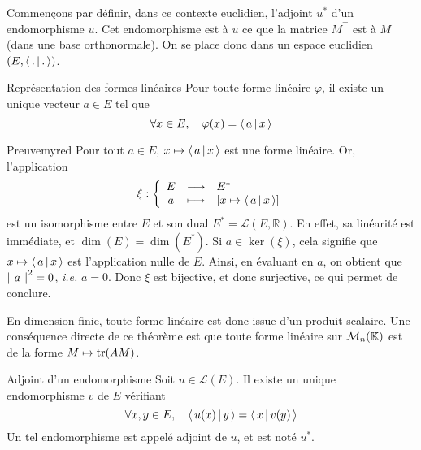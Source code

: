     Commençons par définir, dans ce contexte euclidien, l’adjoint $u^*$ d’un endomorphisme $u$. Cet endomorphisme est à $u$ ce que la matrice $M^{\top}$ est à $M$ (dans une base orthonormale). On se place donc dans un espace euclidien $\left(E,\left<\,.\,\middle|\,.\,\right>\right)$.

    \begin{theo}{Représentation des formes linéaires}{}
        Pour toute forme linéaire $\varphi$, il existe un unique vecteur $a \in E$ tel que 
        \[ \forall x \in E, \quad \varphi(x) = \left<\,a\,\middle|\,x\,\right> \]
    \end{theo}
    
    \begin{demo}{Preuve}{myred}
        Pour tout $a \in E$, $x \mapsto \left<\,a\,\middle|\,x\,\right>$ est une forme linéaire. Or, l’application 
        \[ \fonction{\xi}{E}{E^*}{a}{\left[x \mapsto \spr{a}{x}\right]} \]   
        est un isomorphisme entre $E$ et son dual $E^* = \mathcal{L}(E,\mathbb{R})$. En effet, sa linéarité est immédiate, et $\dim(E) = \dim(E^*)$. Si $a \in \ker(\xi)$, cela signifie que $x \mapsto \left<\,a\,\middle|\,x\,\right>$ est l’application nulle de $E$. Ainsi, en évaluant en $a$, on obtient que $\left\lVert\,a\,\right\rVert^2 = 0$, \textit{i.e.} $a = 0$. Donc $\xi$ est bijective, et donc surjective, ce qui permet de conclure.
    \end{demo}

    En dimension finie, toute forme linéaire est donc issue d’un produit scalaire. Une conséquence directe de ce théorème est que toute forme linéaire sur $\mathcal{M}_{n}(\mathbb{K})$ est de la forme $M \mapsto \operatorname{tr}(AM)$.

    \begin{defitheo}{Adjoint d’un endomorphisme}{}
        Soit $u \in \mathcal{L}(E)$. Il existe un unique endomorphisme $v$ de $E$ vérifiant 
        \[ \forall x, y \in E, \quad \left<\,u(x)\,\middle|\,y\,\right> = \left<\,x\,\middle|\,v(y)\,\right> \]   
        Un tel endomorphisme est appelé adjoint de $u$, et est noté $u^*$.
    \end{defitheo}

